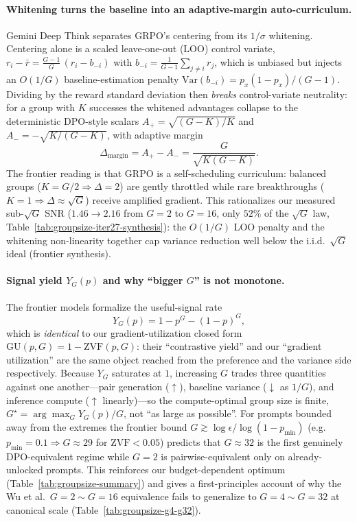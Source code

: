 \documentclass{article}
\begin{document}
\paragraph{Whitening turns the baseline into an adaptive-margin auto-curriculum.}
Gemini Deep Think separates GRPO's centering from its $1/\sigma$
whitening. Centering alone is a scaled leave-one-out (LOO) control
variate, $r_i - \bar r = \tfrac{G-1}{G}\,(r_i - b_{-i})$ with
$b_{-i}=\tfrac{1}{G-1}\sum_{j\ne i} r_j$, which is unbiased but injects
an $O(1/G)$ baseline-estimation penalty
$\mathrm{Var}(b_{-i}) = p_x(1-p_x)/(G-1)$. Dividing by the reward
standard deviation then \emph{breaks} control-variate neutrality: for a
group with $K$ successes the whitened advantages collapse to the
deterministic DPO-style scalars $A_+ = \sqrt{(G-K)/K}$ and
$A_- = -\sqrt{K/(G-K)}$, with adaptive margin
\begin{equation}
  \Delta_\text{margin} = A_+ - A_- = \frac{G}{\sqrt{K(G-K)}}.
  \label{eq:fs-margin}
\end{equation}
The frontier reading is that GRPO is a self-scheduling curriculum:
balanced groups ($K{=}G/2 \Rightarrow \Delta{=}2$) are gently throttled
while rare breakthroughs ($K{=}1 \Rightarrow \Delta \approx \sqrt{G}$)
receive amplified gradient. This rationalizes our measured
sub-$\sqrt{G}$ SNR ($1.46 \to 2.16$ from $G{=}2$ to $G{=}16$, only
$52\%$ of the $\sqrt{G}$ law, Table~\ref{tab:groupsize-iter27-synthesis}): the
$O(1/G)$ LOO penalty and the whitening non-linearity together cap
variance reduction well below the i.i.d.\ $\sqrt{G}$ ideal (frontier
synthesis).

\paragraph{Signal yield $Y_G(p)$ and why ``bigger $G$'' is not monotone.}
The frontier models formalize the useful-signal rate
\begin{equation}
  Y_G(p) = 1 - p^G - (1-p)^G,
  \label{eq:fs-yield}
\end{equation}
which is \emph{identical} to our gradient-utilization closed form
$\mathrm{GU}(p,G) = 1 - \mathrm{ZVF}(p,G)$: their ``contrastive yield''
and our ``gradient utilization'' are the same object reached from the
preference and the variance side respectively. Because $Y_G$ saturates
at $1$, increasing $G$ trades three quantities against one another---pair
generation ($\uparrow$), baseline variance ($\downarrow$ as $1/G$), and
inference compute ($\uparrow$ linearly)---so the compute-optimal group
size is finite, $G^\star = \arg\max_G Y_G(p)/G$, not ``as large as
possible''. For prompts bounded away from the extremes the frontier
bound $G \gtrsim \log\epsilon / \log(1-p_\text{min})$ (e.g.\
$p_\text{min}{=}0.1 \Rightarrow G\approx 29$ for $\mathrm{ZVF}<0.05$)
predicts that $G{\approx}32$ is the first genuinely DPO-equivalent
regime while $G{=}2$ is pairwise-equivalent only on already-unlocked
prompts. This reinforces our budget-dependent optimum
(Table~\ref{tab:groupsize-summary}) and gives a first-principles account
of why the Wu et al.\ $G{=}2{\sim}G{=}16$ equivalence fails to
generalize to $G{=}4{\sim}G{=}32$ at canonical scale
(Table~\ref{tab:groupsize-g4-g32}).
\end{document}
